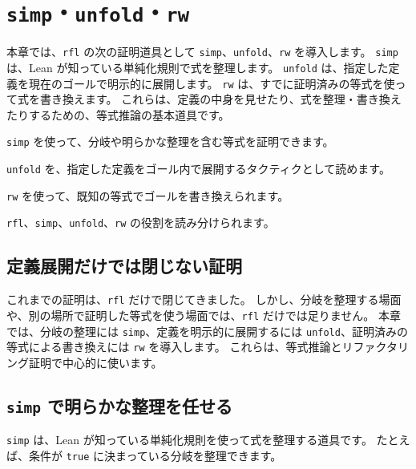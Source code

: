 \chapter{\texttt{simp}・\texttt{unfold}・\texttt{rw}}
\label{chap:ch08_simp_rw}

\begin{chapterabstract}
本章では、\texttt{rfl} の次の証明道具として \texttt{simp}、\texttt{unfold}、\texttt{rw} を導入します。
\texttt{simp} は、Lean が知っている単純化規則で式を整理します。
\texttt{unfold} は、指定した定義を現在のゴールで明示的に展開します。
\texttt{rw} は、すでに証明済みの等式を使って式を書き換えます。
これらは、定義の中身を見せたり、式を整理・書き換えたりするための、等式推論の基本道具です。
\end{chapterabstract}

\begin{learninggoals}
\item \texttt{simp} を使って、分岐や明らかな整理を含む等式を証明できます。
\item \texttt{unfold} を、指定した定義をゴール内で展開するタクティクとして読めます。
\item \texttt{rw} を使って、既知の等式でゴールを書き換えられます。
\item \texttt{rfl}、\texttt{simp}、\texttt{unfold}、\texttt{rw} の役割を読み分けられます。
\end{learninggoals}

\section{定義展開だけでは閉じない証明}

これまでの証明は、\texttt{rfl} だけで閉じてきました。
しかし、分岐を整理する場面や、別の場所で証明した等式を使う場面では、\texttt{rfl} だけでは足りません。
本章では、分岐の整理には \texttt{simp}、定義を明示的に展開するには \texttt{unfold}、証明済みの等式による書き換えには \texttt{rw} を導入します。
これらは、等式推論とリファクタリング証明で中心的に使います。

\section{\texttt{simp} で明らかな整理を任せる}

\texttt{simp} は、Lean が知っている単純化規則を使って式を整理する道具です。
たとえば、条件が \texttt{true} に決まっている分岐を整理できます。

